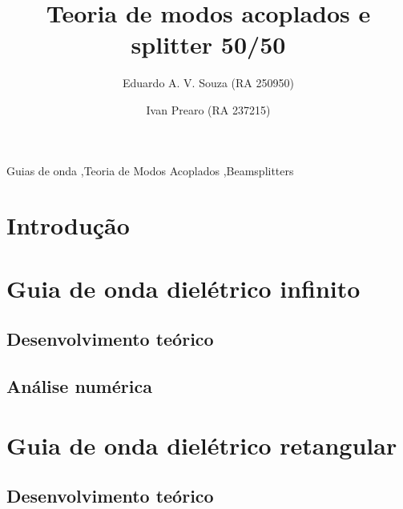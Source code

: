 \documentclass[final,12pt,times,twocolumn,authoryear]{elsarticle}
\begin{document}
\begin{frontmatter}

\title{Teoria de modos acoplados e splitter 50/50}

\author[1]{Eduardo A. V. Souza (RA 250950)}
\author[1]{Ivan Prearo (RA 237215)}


\begin{abstract}
    
\end{abstract}

\begin{keyword}
    Guias de onda \sep Teoria de Modos Acoplados \sep Beamsplitters
\end{keyword}


\end{frontmatter}

\section{Introdução}
\label{sec:intro}

\section{Guia de onda dielétrico infinito}
\label{sec:slab}

\subsection{Desenvolvimento teórico}
\label{subsec:slab_theory}

\subsection{Análise numérica}
\label{subsec:slab_num}

\section{Guia de onda dielétrico retangular}
\label{subsec:rectangle}

\subsection{Desenvolvimento teórico}
\label{subsec:rectangle_theory}
\end{document}
